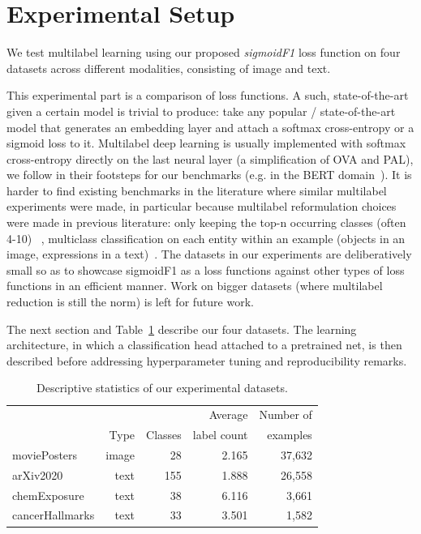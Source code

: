 
\section{Experimental Setup}
\label{sec:orgb44ba25}

We test multilabel learning using our proposed \emph{sigmoidF1} loss function on four datasets across different modalities, consisting of image and text.

This experimental part is a comparison of loss functions. A such, state-of-the-art given a certain model is trivial to produce: take any popular / state-of-the-art model that generates an embedding layer and attach a softmax cross-entropy or a sigmoid loss to it. Multilabel deep learning is usually implemented with softmax cross-entropy directly on the last neural layer  (a simplification of OVA and PAL), we follow in their footsteps for our benchmarks (e.g. in the BERT domain~\cite{bigBird, BERT}). It is harder to find existing benchmarks in the literature where similar multilabel experiments were made, in particular because multilabel reformulation choices were made in previous literature: only keeping the top-n occurring classes (often 4-10) ~\cite[e.g.][]{textClassificationLeCun, CUNHA}, multiclass classification on each entity within an example (objects in an image, expressions in a text)~\cite[e.g.][]{COCO, multilabelImage1, multilabelImage2, multilabelImage3}. The datasets in our experiments are deliberatively small so as to showcase sigmoidF1 as a loss functions against other types of loss functions in an efficient manner. Work on bigger datasets (where multilabel reduction is still the norm) is left for future work.

The next section and Table~\ref{table:datasets} describe our four datasets. The learning architecture, in which a classification head attached to a pretrained net, is then described before addressing hyperparameter tuning and reproducibility remarks.

\begin{table}[b]
\caption{Descriptive statistics of our experimental datasets.}
\label{table:datasets}
\centering
\begin{tabular}{l rrrr}
\toprule
& & & Average & Number of \\
& Type & Classes & label count & examples \\
\midrule
moviePosters & image & 28 & 2.165 & 37,632\\
arXiv2020 & text & 155 & 1.888 & 26,558\\
chemExposure & text & 38 & 6.116 & 3,661\\
cancerHallmarks\hspace{-.7em}  & text & 33 & 3.501 & 1,582\\
\bottomrule
\end{tabular}
\end{table}

